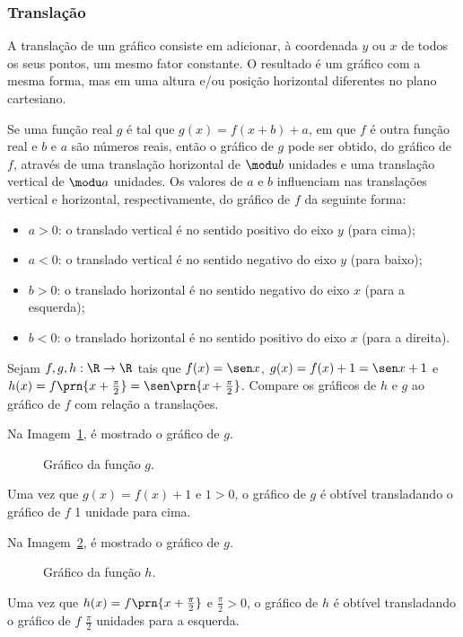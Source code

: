 \subsubsection{Translação}

A translação de um gráfico consiste em adicionar, à coordenada $y$ ou $x$ de todos os seus pontos, um mesmo fator constante.
O resultado é um gráfico com a mesma forma, mas em uma altura e/ou posição horizontal diferentes no plano cartesiano.

Se uma função real $g$ é tal que $g(x) = f(x+b) +a$, em que $f$ é outra função real e $b$ e $a$ são números reais,
então o gráfico de $g$ pode ser obtido, do gráfico de $f$, através
de uma translação horizontal de $\modu b$ unidades e uma
translação vertical de $\modu a$ unidades.
Os valores de $a$ e $b$ influenciam nas translações vertical e horizontal, respectivamente, do gráfico de $f$ da seguinte forma:

\begin{itemize}
  \item $a > 0$: o translado vertical é no sentido positivo do eixo $y$ (para cima);
  \item $a < 0$: o translado vertical é no sentido negativo do eixo $y$ (para baixo);
  \item $b > 0$: o translado horizontal é no sentido negativo do eixo $x$ (para a esquerda);
  \item $b < 0$: o translado horizontal é no sentido positivo do eixo $x$ (para a direita).
\end{itemize}

\begin{example}
Sejam $f,g,h:\R \to \R$ tais que $f(x) = \sen x$, $g(x) = f(x) + 1 = \sen x +1$ e $h(x)= f\prn{x+\frac {\pi} 2}= \sen \prn{x+ \frac {\pi} 2}$.
Compare os gráficos de $h$ e $g$ ao gráfico de $f$ com relação a translações.
\end{example}

\begin{solution}
Na Imagem~\ref{img:grafico-translacao-exemplo-g}, é mostrado o gráfico de $g$.
%
  \begin{figure}
    \centering
    
    \caption{Gráfico da função $g$.}
    \label{img:grafico-translacao-exemplo-g}
  \end{figure}
%
\noindent Uma vez que $g(x) = f(x)+1$ e $1>0$, o gráfico de $g$ é obtível transladando o gráfico de $f$ 1 unidade para cima.

Na Imagem~\ref{img:grafico-translacao-exemplo-h}, é mostrado o gráfico de $g$.
%
  \begin{figure}
    \centering
    
    \caption{Gráfico da função $h$.}
    \label{img:grafico-translacao-exemplo-h}
  \end{figure}
%
\noindent Uma vez que $h(x) = f\prn{x+\frac {\pi} 2}$ e $\frac {\pi} 2>0$, o gráfico de $h$ é obtível transladando o gráfico de $f$ $\frac {\pi} 2$ unidades para a esquerda.
\end{solution}    